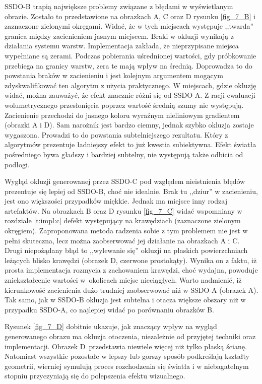 		SSDO-B trapią największe problemy związane z błędami w wyświetlanym obrazie. Zostało to przedstawione na obrazkach A, C oraz D rysunku \ref{fig_7_B} i zaznaczone zielonymi okręgami. Widać, że w tych miejscach występuje ,,twarda'' granica między zacienieniem jasnym miejscem. Braki w okluzji wynikają z działania systemu warstw. Implementacja zakłada, że nieprzypisane miejsca wypełniane są zerami. Podczas pobierania uśrednionej wartości, gdy próbkowanie przebiega na granicy warstw, zera te mają wpływ na średnią. Doprowadza to do powstania braków w zacienieniu i jest kolejnym argumentem mogącym zdyskwalifikować ten algorytm z użycia praktycznego. W miejscach, gdzie okluzję widać, można zauważyć, że efekt znacznie różni się od SSDO-A. Z racji ewaluacji wolumetrycznego przesłonięcia poprzez wartość średnią szumy nie występują. Zacienienie przechodzi do jasnego koloru wyraźnym nieliniowym gradientem (obrazki A i D). Sam narożnik jest bardzo ciemny, jednak szybko okluzja zostaje wygaszona. Prowadzi to do powstania subtelniejszego rezultatu. Który z algorytmów prezentuje ładniejszy efekt to już kwestia subiektywna. Efekt światła pośredniego bywa gładszy i bardziej subtelny, nie występują także odbicia od podłogi.
		
		Wygląd okluzji generowanej przez SSDO-C pod względem nieistnienia błędów prezentuje się lepiej od SSDO-B, choć nie idealnie. Brak tu ,,dziur'' w zacienieniu, jest ono większości przypadków miękkie. Jednak ma miejsce inny rodzaj artefaktów. Na obrazkach B oraz D rysunku \ref{fig_7_C} widać wspomniany w rozdziale \ref{t:impl:c} defekt występujący na krawędziach (zaznaczone zielonym okręgiem). Zaproponowana metoda radzenia sobie z tym problemem nie jest w pełni skuteczna, lecz można zaobserwować jej działanie na obrazkach A i C. Drugi niepożądany błąd to ,,wylewanie się'' okluzji na płaskich powierzchniach leżących blisko krawędzi (obrazek D, czerwone prostokąty). Wynika on z faktu, iż prosta implementacja rozmycia z zachowaniem krawędzi, choć wydajna, powoduje zniekształcenie wartości w~okolicach miejsc nieciągłych. Warto nadmienić, iż kierunkowość zacienienia dużo trudniej zaobserwować niż w SSDO-A (obrazek A).
		Tak samo, jak w SSDO-B okluzja jest subtelna i otacza większe obszary niż w przypadku SSDO-A, co najlepiej widać po porównaniu obrazków B.
		
		Rysunek \ref{fig_7_D} dobitnie ukazuje, jak znaczący wpływ na wygląd generowanego obrazu ma okluzja otoczenia, niezależnie od przyjętej techniki oraz implementacji. Obrazek D~przedstawia niewiele więcej niż tylko płaską ścianę. Natomiast wszystkie pozostałe w lepszy lub gorszy sposób podkreślają kształty geometrii, wierniej symulują proces rozchodzenia się światła i w niebagatelnym stopniu przyczyniają się do polepszenia efektu wizualnego.
	
